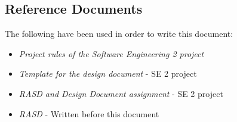 \subsection{Reference Documents}
The following have been used in order to write this document:
\begin{itemize}
    \item \emph{Project rules of the Software Engineering 2 project} 
    \item \emph{Template for the design document} - SE 2 project 
    \item \emph{RASD and Design Document assignment} - SE 2 project 
    \item \emph{RASD} - Written before this document
\end{itemize}



